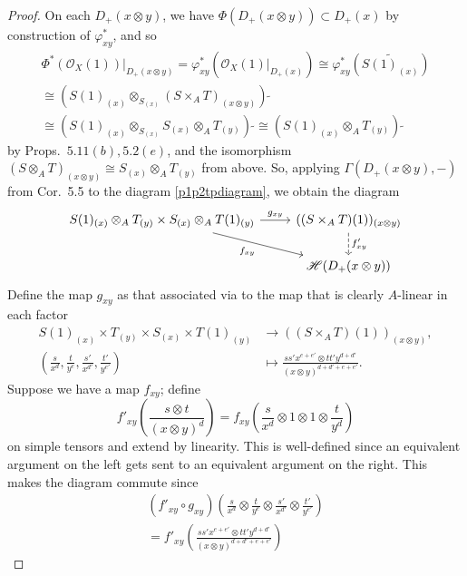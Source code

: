 \documentclass[12pt,letterpaper]{article}
\theoremstyle{definition}
\theoremstyle{remark}
\numberwithin{equation}{section}
\numberwithin{figure}{problem}
\newcommand{\HH}{\mathscr{H}}
\newcommand{\OO}{\mathcal{O}}
\begin{document}
\begin{proof}
  On each $D_+(x \otimes y)$, we have $\Phi(D_+(x \otimes y)) \subset D_+(x)$ by construction of $\varphi_{xy}^*$, and so
  \begin{multline*}
    \Phi^*(\OO_X(1))\vert_{D_+(x \otimes y)} = \varphi_{xy}^*(\OO_X(1)\vert_{D_+(x)}) \cong \varphi_{xy}^*(\widetilde{S(1)_{(x)}})\\
    \cong (S(1)_{(x)} \otimes_{S_{(x)}} (S \times_A T)_{(x \otimes y)})\:\tilde{}\\
    \cong (S(1)_{(x)} \otimes_{S_{(x)}} S_{(x)} \otimes_A T_{(y)})\:\tilde{} \cong (S(1)_{(x)} \otimes_A T_{(y)})\:\tilde{}
  \end{multline*}
  by Props.~$5.11(b),5.2(e)$, and the isomorphism $(S \otimes_A T)_{(x \otimes y)} \cong S_{(x)} \otimes_A T_{(y)}$ from above. So, applying $\Gamma(D_+(x \otimes y),-)$ from Cor.~5.5 to the diagram \eqref{p1p2tpdiagram}, we obtain the diagram
  \begin{equation*}
    \begin{tikzcd}
      S(1)_{(x)} \otimes_A T_{(y)} \times S_{(x)} \otimes_A T(1)_{(y)} \rar{g_{xy}}\arrow{dr}[swap]{f_{xy}} & ((S \times_A T)(1))_{(x \otimes y)}\dar[dashed]{f'_{xy}}\\
      & \HH(D_+(x \otimes y))
    \end{tikzcd}
  \end{equation*}
  Define the map $g_{xy}$ as that associated via \cite[Props.~2.11, 2.12*]{AM69} to the map that is clearly $A$-linear in each factor
  \begin{align*}
    S(1)_{(x)} \times T_{(y)} \times S_{(x)} \times T(1)_{(y)} &\to ((S \times_A T)(1))_{(x \otimes y)},\\
    \left( \frac{s}{x^d},\frac{t}{y^e},\frac{s'}{x^{d'}},\frac{t'}{y^{e'}} \right) &\mapsto \frac{ss'x^{e+e'} \otimes tt'y^{d+d'}}{(x \otimes y)^{d+d'+e+e'}}.
  \end{align*}
  Suppose we have a map $f_{xy}$; define
  \begin{equation*}
    f'_{xy}\left( \frac{s \otimes t}{(x \otimes y)^{d}} \right) = f_{xy}\left( \frac{s}{x^{d}} \otimes 1 \otimes 1 \otimes \frac{t}{y^{d}} \right)
  \end{equation*}
  on simple tensors and extend by linearity. This is well-defined since an equivalent argument on the left gets sent to an equivalent argument on the right.  This makes the diagram commute since
  \begin{multline*}
    (f'_{xy} \circ g_{xy})\left( \frac{s}{x^{d}}\otimes\frac{t}{y^e}\otimes\frac{s'}{x^{d'}}\otimes\frac{t'}{y^{e'}} \right)\\ = f'_{xy}\left( \frac{ss'x^{e+e'} \otimes tt'y^{d+d'}}{(x \otimes y)^{d+d'+e+e'}} \right)

\end{multline*}
\end{proof}
\end{document}
